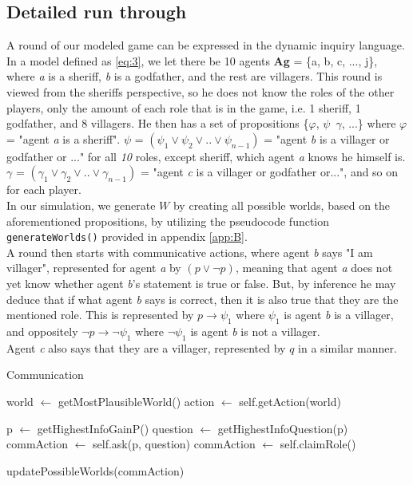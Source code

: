 \subsection{Detailed run through}\label{ARoundOfTheGame}
A round of our modeled game can be expressed in the dynamic inquiry language.
In a model defined as \cref{eq:3}, we let there be 10 agents \textbf{Ag} = \{a,
b, c, ..., j\}, where \textit{a} is a sheriff, \textit{b} is a godfather, and
the rest are villagers. This round is viewed from the sheriffs perspective, so
he does not know the roles of the other players, only the amount of each role
that is in the game, i.e. 1 sheriff, 1 godfather, and 8 villagers. He then has
a set of propositions \{$\varphi$, $\psi$\, $\gamma$, ...\} where $\varphi$ =
"agent \textit{a} is a sheriff". $\psi$ = $(\psi_1 \lor \psi_2 \lor .. \lor
	\psi_{n-1})$ = "agent \textit{b} is a villager or godfather or ..." for all
\textit{10} roles, except sheriff, which agent \textit{a} knows he himself is.
$\gamma$ = $(\gamma_1 \lor \gamma_2 \lor .. \lor \gamma_{n-1}) $ = "agent
\textit{c} is a villager or godfather or...", and so on for each player. \\ In
our simulation, we generate $W$ by creating all possible worlds, based on the
aforementioned propositions, by utilizing the pseudocode function
\lstinline{generateWorlds()} provided in appendix \ref{app:B}. \\ A round then
starts with communicative actions, where agent \textit{b} says "I am villager",
represented for agent \textit{a} by $(p \lor \neg p)$, meaning that agent
\textit{a} does not yet know whether agent \textit{b}'s statement is true or
false. But, by inference he may deduce that if what agent \textit{b} says is
correct, then it is also true that they are the mentioned role. This is
represented by $p \rightarrow \psi_1$ where $\psi_1$ is agent \textit{b} is a
villager, and oppositely $\neg p \rightarrow \neg \psi_1$ where $\neg \psi_1$
is agent \textit{b} is not a villager. \\ Agent \textit{c} also says that they
are a villager, represented by $q$ in a similar manner.

\begin{algorithm}
	\caption{Communication}
	\begin{algorithmic}[1]
		\State world $\gets$ getMostPlausibleWorld()
		\State action $\gets$ self.getAction(world)

		\State p $\gets$ getHighestInfoGainP()
		\State question $\gets$ getHighestInfoQuestion(p)
		\State commAction $\gets$ self.ask(p, question)
		\State commAction $\gets$ self.claimRole()
		\EndIf

		\State updatePossibleWorlds(commAction)
		\EndFunction
	\end{algorithmic}
\end{algorithm}\label{lst:communicate}

